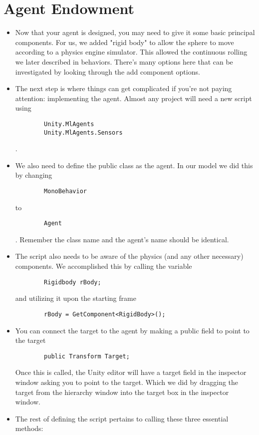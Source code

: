\documentclass[11pt,fleqn,openany]{book} %
\begin{document}
\section{Agent Endowment}
\begin{itemize}
    \item Now that your agent is designed, you may need to give it some basic principal components. For us, we added "rigid body" to allow the sphere to move according to a physics engine simulator. This allowed the continuous rolling we later described in behaviors. There's many options here that can be investigated by looking through the add component options.
    \item The next step is where things can get complicated if you're not paying attention: implementing the agent. Almost any project will need a new script using \begin{verbatim}
        Unity.MlAgents
        Unity.MlAgents.Sensors
    \end{verbatim} . 
    \item We also need to define the public class as the agent. In our model we did this by changing \begin{verbatim}
        MonoBehavior
    \end{verbatim}to \begin{verbatim}
        Agent
    \end{verbatim}. Remember the class name and the agent's name should be identical.
    \item The script also needs to be aware of the physics (and any other necessary) components. We accomplished this by calling the variable \begin{verbatim}
        Rigidbody rBody;
    \end{verbatim} and utilizing it upon the starting frame \begin{verbatim}
        rBody = GetComponent<RigidBody>();
    \end{verbatim}
    \item You can connect the target to the agent by making a public field to point to the target \begin{verbatim}
        public Transform Target;
    \end{verbatim} Once this is called, the Unity editor will have a target field in the inspector window asking you to point to the target. Which we did by dragging the target from the hierarchy window into the target box in the inspector window.
    \item The rest of defining the script pertains to calling these three essential methods: \begin{verbatim}

\end{verbatim}
\end{itemize}
\end{document}
